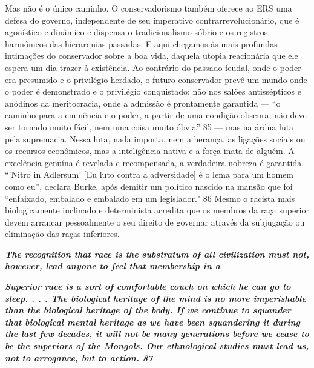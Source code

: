Mas não é o único caminho. O conservadorismo também oferece ao ERS uma defesa do governo, independente de seu imperativo contrarrevolucionário, que é agonístico e dinâmico e dispensa o tradicionalismo sóbrio e os registros harmônicos das hierarquias passadas. E aqui chegamos às mais profundas intimações do conservador sobre a boa vida, daquela utopia reacionária que ele espera um dia trazer à existência. Ao contrário do passado feudal, onde o poder era presumido e o privilégio herdado, o futuro conservador prevê um mundo onde o poder é demonstrado e o privilégio conquistado: não nos salões antissépticos e anódinos da meritocracia, onde a admissão é prontamente garantida — “o caminho para a eminência e o poder, a partir de uma condição obscura, não deve ser tornado muito fácil, nem uma coisa muito óbvia”
 {\color{blue} 85}  
— mas na árdua luta pela supremacia. Nessa luta, nada importa, nem a herança, as ligações sociais ou os recursos econômicos, mas a inteligência nativa e a força inata de alguém. A excelência genuína é revelada e recompensada, a verdadeira nobreza é garantida. “'Nitro in Adlersum' [Eu luto contra a adversidade] é o lema para um homem como eu”, declara Burke, após demitir um político nascido na mansão que foi “enfaixado, embalado e embalado em um legislador."
 {\color{blue} 86}  
Mesmo o racista mais biologicamente inclinado e determinista acredita que os membros da raça superior devem arrancar pessoalmente o seu direito de governar através da subjugação ou eliminação das raças inferiores.
 
\par
 

 \textbf{\textit{The recognition that race is the substratum of all civilization must not, however, lead anyone to feel that membership in a} }  
 
 
\par
 

 
\par
 

 \textbf{\textit{Superior race is a sort of comfortable couch on which he can go to sleep. . . . The biological heritage of the mind is no more imperishable than the biological heritage of the body. If we continue to squander that biological mental heritage as we have been squandering it during the last few decades, it will not be many generations before we cease to be the superiors of the Mongols. Our ethnological studies must lead us, not to arrogance, but to action. {{\color{blue} 87} } } }  
 
